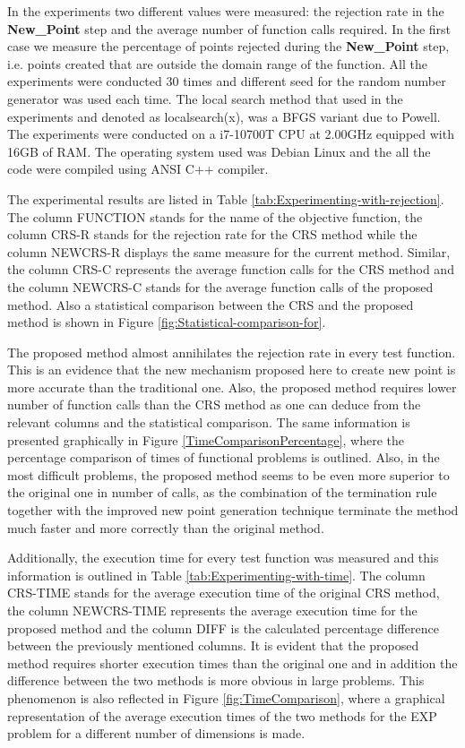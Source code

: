 \documentclass[symmetry,article,submit,moreauthors,pdftex]{Definitions/mdpi}
\begin{document}
In the experiments two different values were measured: the rejection
rate in the\textbf{ New\_Point} step and the average number of function
calls required. In the first case we measure the percentage of points
rejected during the\textbf{ New\_Point} step, i.e. points created
that are outside the domain range of the function. All the experiments
were conducted 30 times and different seed for the random number generator
was used each time. The local search method that used in the experiments
and denoted as localsearch(x), was a BFGS variant due to Powell\cite{powell}. The experiments were conducted on a  i7-10700T CPU at 2.00GHz equipped with 16GB of RAM. The operating system used was Debian Linux and the all the code were compiled using ANSI C++ compiler.

The experimental results are listed in Table \ref{tab:Experimenting-with-rejection}.
The column FUNCTION stands for the name of the objective function,
the column CRS-R stands for the rejection rate\textbf{ }for the CRS
method while the column NEWCRS-R displays  the same measure for the
current method. Similar, the column CRS-C represents the average
function calls for the CRS method and the column NEWCRS-C stands for
the average function calls of the proposed method. Also a statistical
comparison between the CRS and the proposed method is shown in Figure
\ref{fig:Statistical-comparison-for}.

The proposed method almost annihilates the rejection rate in every
test function. This is an evidence that the new mechanism proposed
here to create new point is more accurate than the traditional one.
Also, the proposed method requires lower number of function calls
than the CRS method as one can deduce from the relevant columns and
the statistical comparison. The same information is presented graphically in Figure \ref{TimeComparisonPercentage}, where the percentage comparison of times of functional problems
is outlined. Also, in the most difficult problems, the proposed method seems to be even more superior to the original one in  number of calls, as the combination of the termination rule together with the improved new point generation technique terminate the method much faster and more correctly than the original method. 

Additionally, the execution time for every test function was measured and this information  is outlined in Table \ref{tab:Experimenting-with-time}. The column CRS-TIME stands for the average execution time of the original CRS method, the column NEWCRS-TIME represents the average execution time for the proposed method and the column DIFF is the calculated percentage difference between the previously mentioned columns.  It is evident that the proposed method requires shorter execution times than the original one and in addition the difference between the two methods is more obvious in large problems. This phenomenon is also reflected in Figure \ref{fig:TimeComparison}, where a graphical representation of the average execution times of the two methods for the EXP problem for a different number of dimensions is made. 
\end{document}
